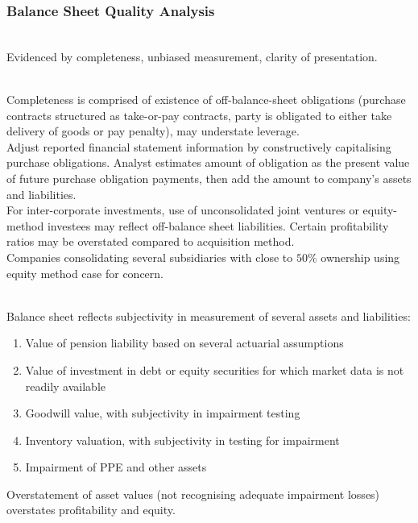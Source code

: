 \subsubsection{Balance Sheet Quality Analysis}

\begin{remark} \\
Evidenced by completeness, unbiased measurement, clarity of presentation.
\end{remark}

\begin{remark} \\
Completeness is comprised of existence of off-balance-sheet obligations (purchase contracts structured as take-or-pay contracts, party is obligated to either take delivery of goods or pay penalty), may understate leverage.\\
Adjust reported financial statement information by constructively capitalising purchase obligations. Analyst estimates amount of obligation as the present value of future purchase obligation payments, then add the amount to company's assets and liabilities.\\
For inter-corporate investments, use of unconsolidated joint ventures or equity-method investees may reflect off-balance sheet liabilities. Certain profitability ratios may be overstated compared to acquisition method.\\
Companies consolidating several subsidiaries with close to $50\%$ ownership using equity method case for concern.
\end{remark}

\begin{remark} \\
Balance sheet reflects subjectivity in measurement of several assets and liabilities:
	\begin{enumerate}[label=\roman*.]
\setlength{\itemsep}{0pt}
\item Value of pension liability based on several actuarial assumptions
\item Value of investment in debt or equity securities for which market data is not readily available
\item Goodwill value, with subjectivity in impairment testing
\item Inventory valuation, with subjectivity in testing for impairment
\item Impairment of PPE and other assets
\end{enumerate}
Overstatement of asset values (not recognising adequate impairment losses) overstates profitability and equity.
\end{remark}

